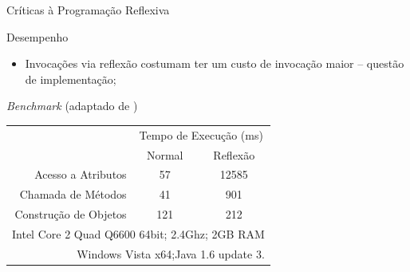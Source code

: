 \documentclass[12pt,t]{beamer}
\begin{document}
	 \begin{frame}{Críticas à Programação Reflexiva}
 	 	\begin{block}{Desempenho}
 	 		\begin{itemize}
 	 			\item Invocações via reflexão costumam ter um custo de invocação maior -- \alert{questão de implementação};
 	 		\end{itemize}
 	 	\end{block}
 	 	\begin{block}{\emph{Benchmark} (adaptado de )}
			\begin{table}[h]
				\begin{tabular}{rcc}
					& \multicolumn{2}{c}{Tempo de Execução (ms)} \\
					& Normal              & Reflexão             \\
					\hline \hline
					Acesso a Atributos    & 57                  & 12585                \\
					Chamada de Métodos    & 41                  & 901                  \\
					Construção de Objetos & 121                 & 212                  \\ \hline
					\multicolumn{3}{r}{\footnotesize{Intel Core 2 Quad Q6600 64bit; 2.4Ghz; 2GB RAM}}\\
					\multicolumn{3}{r}{\footnotesize{Windows Vista x64;Java 1.6 update 3.}}\\										
					\hline
				\end{tabular}
			\end{table} 	 
 	 	\end{block}
 	 \end{frame}
\end{document}
